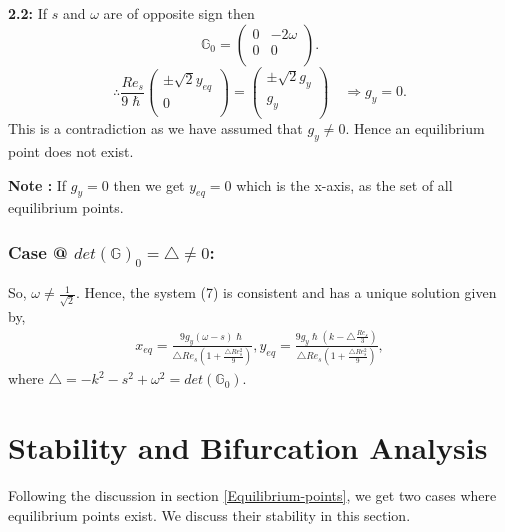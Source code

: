 \documentclass[pdflatex,sn-mathphys]{sn-jnl}%
\makeatletter
\theoremstyle{thmstyleone}%
\theoremstyle{thmstyletwo}%
\theoremstyle{thmstylethree}%
\newcommand*{\rom}[1]{\expandafter\@slowromancap\romannumeral #1@}
\makeatother
\begin{document}
\textbf{2.2:} If $s$ and $\omega$ are of opposite sign then 
$$\mathbb{G}_{0}=\left(
\begin{array}{cc}
 0 & -2\omega \\
0 & 0 \\
\end{array}
\right) .$$
 $$ \therefore  \frac{Re_{s}}{9\hslash}\left(
\begin{array}{cc}
\pm \sqrt{2}y_{eq}  \\
0 \\
\end{array}
\right)=
\left(
\begin{array}{cc}
 \pm \sqrt{2}g_{y}\\
g_{y} \\
\end{array}
\right)\quad \Rightarrow g_{y}=0.$$ This is a contradiction as we have assumed that $g_{y} \neq 0$. Hence an equilibrium point does not exist.

\textbf{Note :} If $g_{y}=0$  then we get $y_{eq}=0$ which is the x-axis, as the set of all equilibrium points.


\subsubsection{Case \rom{2} $det(\mathbb{G})_0 = \triangle \neq 0$: } 
So, $ \omega \neq \frac{1}{\sqrt{2}}.$
Hence, the system (7) is consistent and has a unique solution given by,
\begin{equation}
  \begin{aligned}
 x_{eq}= \frac{9 g_{y}(\omega-s)\hslash}{\triangle Re_{s}(1+\frac{\triangle Re_{s}^2}{9})}, y_{eq}= \frac{9g_{y}\hslash(k-\triangle\frac{Re_{s}}{3})}{\triangle Re_{s}(1+\frac{\triangle Re_{s}^2}{9})},\label{unique eq point}  \end{aligned}
\end{equation} 
 where $\triangle=-k^2-s^2+\omega^2= det(\mathbb{G}_{0})$. 





\section{Stability and Bifurcation Analysis}\label{Stability and Bifurcation Analysis}
Following the discussion in section \ref{Equilibrium-points}, we get two cases where equilibrium points exist. We discuss their stability in this section.
\end{document}
